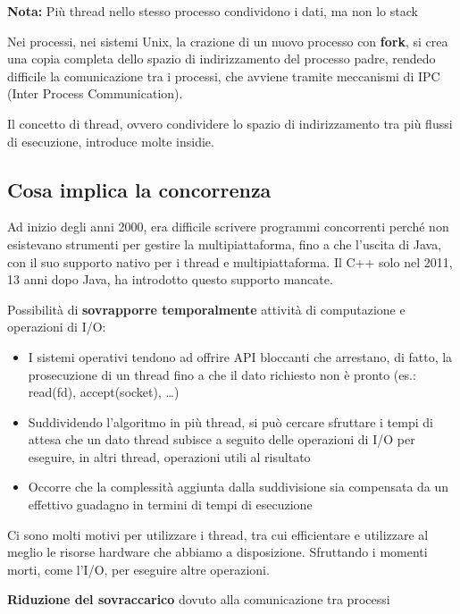 \begin{tcolorbox}
  \textbf{Nota:} Più thread nello stesso processo condividono i dati, ma non lo stack
\end{tcolorbox}


Nei processi, nei sistemi Unix, la crazione di un nuovo processo con \textbf{fork},
si crea una copia completa dello spazio di indirizzamento del processo padre,
rendedo difficile la comunicazione tra i processi, che avviene tramite meccanismi di
IPC (Inter Process Communication).

Il concetto di thread, ovvero condividere lo spazio di indirizzamento tra più flussi
di esecuzione, introduce molte insidie.

\subsection{Cosa implica la concorrenza}
Ad inizio degli anni 2000, era difficile scrivere programmi concorrenti perché
non esistevano strumenti per gestire la multipiattaforma, fino a che l'uscita
di Java, con il suo supporto nativo per i thread e multipiattaforma.
Il C++ solo nel 2011, 13 anni dopo Java, ha introdotto questo supporto mancate.


Possibilità di \textbf{sovrapporre temporalmente} attività di computazione e
operazioni di I/O:

\begin{itemize}
  \item I sistemi operativi tendono ad offrire API bloccanti che arrestano, di fatto, la prosecuzione di un
        thread fino a che il dato richiesto non è pronto (es.: read(fd), accept(socket), …)
  \item  Suddividendo l'algoritmo in più thread, si può cercare sfruttare i tempi di attesa che un dato thread
        subisce a seguito delle operazioni di I/O per eseguire, in altri thread, operazioni utili al risultato
  \item  Occorre che la complessità aggiunta dalla suddivisione sia compensata da un effettivo guadagno in
        termini di tempi di esecuzione
\end{itemize}


Ci sono molti motivi per utilizzare i thread, tra cui efficientare e utilizzare
al meglio le risorse hardware che abbiamo a disposizione. Sfruttando
i momenti morti, come l'I/O, per eseguire altre operazioni.


\textbf{Riduzione del sovraccarico} dovuto alla comunicazione tra processi

